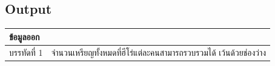 \documentclass{article}
\begin{document}
\subsection*{Output}
{\def\LTcaptype{none} %

\begin{longtable}[]{@{}

  >{\raggedright\arraybackslash}p{}

  >{\raggedright\arraybackslash}p{}@{}}

\toprule\noalign{}

\begin{minipage}[b]{\linewidth}\raggedright

ข้อมูลออก

\end{minipage} & \begin{minipage}[b]{\linewidth}\raggedright

\hfill\break

\strut

\end{minipage} \\

\midrule\noalign{}

\endhead

\bottomrule\noalign{}

\endlastfoot

บรรทัดที่ 1 & จำนวนเหรียญทั้งหมดที่ฮีโร่แต่ละคนสามารถรวบรวมได้ เว้นด้วยช่องว่าง \\

\end{longtable}

}
\end{document}
